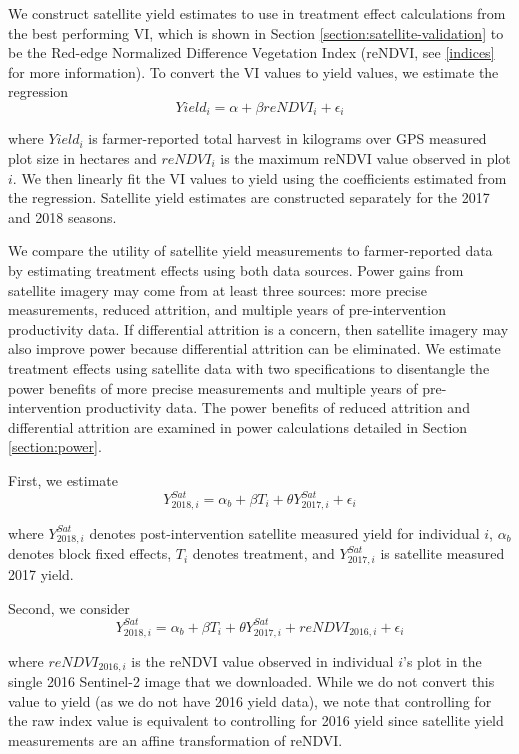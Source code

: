 \documentclass{article}
\begin{document}
We construct satellite yield estimates to use in treatment effect calculations from the best performing VI, which is shown in Section \ref{section:satellite-validation} to be the Red-edge Normalized Difference Vegetation Index (reNDVI, see \ref{indices} for more information). To convert the VI values to yield values, we estimate the regression 
$$
Yield_i = \alpha + \beta reNDVI_i + \epsilon_i
$$

where $Yield_i$ is farmer-reported total harvest in kilograms over GPS measured plot size in hectares and $reNDVI_i$ is the maximum reNDVI value observed in plot $i$. We then linearly fit the VI values to yield using the coefficients estimated from the regression. Satellite yield estimates are constructed separately for the 2017 and 2018 seasons.

We compare the utility of satellite yield measurements to farmer-reported data by estimating treatment effects using both data sources. Power gains from satellite imagery may come from at least three sources: more precise measurements, reduced attrition, and multiple years of pre-intervention productivity data. If differential attrition is a concern, then satellite imagery may also improve power because differential attrition can be eliminated. We estimate treatment effects using satellite data with two specifications to disentangle the power benefits of more precise measurements and multiple years of pre-intervention productivity data. The power benefits of reduced attrition and differential attrition are examined in power calculations detailed in Section \ref{section:power}. 

First, we estimate 
$$
Y_{2018,i}^{Sat} = \alpha_b + \beta T_i + \theta Y_{2017,i}^{Sat} + \epsilon_i
$$

where $Y_{2018,i}^{Sat}$ denotes post-intervention satellite measured yield for individual $i$, $\alpha_b$ denotes block fixed effects, $T_i$ denotes treatment, and $Y_{2017,i}^{Sat}$ is satellite measured 2017 yield. 

Second, we consider 
$$
Y_{2018,i}^{Sat} = \alpha_b + \beta T_i + \theta Y_{2017,i}^{Sat} + reNDVI_{2016,i} + \epsilon_i
$$

where $reNDVI_{2016, i}$ is the reNDVI value observed in individual $i$'s plot in the single 2016 Sentinel-2 image that we downloaded. While we do not convert this value to yield (as we do not have 2016 yield data), we note that controlling for the raw index value is equivalent to controlling for 2016 yield since satellite yield measurements are an affine transformation of reNDVI.
\end{document}
